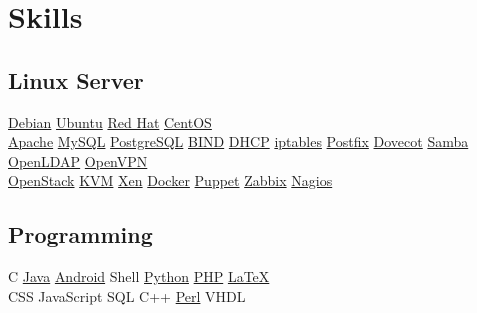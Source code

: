 \documentclass[]{deedy-resume-openfont}
\begin{document}
\begin{minipage}[t]{0.33\textwidth}

\section{Skills}
\subsection{Linux Server}
\href{http://www.debian.org/}{Debian} \textbullet{}
\href{http://www.ubuntu.com/}{Ubuntu} \textbullet{}
\href{http://www.redhat.com/}{Red Hat} \textbullet{}
\href{http://www.centos.org/}{CentOS} \\
\href{http://httpd.apache.org/}{Apache} \textbullet{}
\href{https://www.mysql.com/}{MySQL} \textbullet{}
\href{http://www.postgresql.org/}{PostgreSQL} \textbullet{}
\href{https://www.isc.org/downloads/bind/}{BIND}
\href{https://www.isc.org/downloads/dhcp/}{DHCP} \textbullet{}
\href{http://www.netfilter.org/}{iptables} \textbullet{}
\href{http://www.postfix.org/}{Postfix} \textbullet{}
\href{http://www.dovecot.org/}{Dovecot}
\href{https://www.samba.org/}{Samba} \textbullet{}
\href{http://www.openldap.org/}{OpenLDAP} \textbullet{}
\href{https://openvpn.net/}{OpenVPN} \\
\href{http://openstack.org/}{OpenStack} \textbullet{}
\href{http://www.linux-kvm.org/}{KVM} \textbullet{}
\href{http://xenproject.org/}{Xen} \textbullet{}
\href{http://www.docker.com/}{Docker}
\href{http://puppetlabs.com/}{Puppet} \textbullet{}
\href{http://www.zabbix.com/}{Zabbix} \textbullet{}
\href{http://www.nagios.com/}{Nagios}
\sectionsep

\subsection{Programming}
C \textbullet{}
\href{https://www.oracle.com/java/}{Java} \textbullet{}
\href{http://android.com}{Android} \textbullet{}
Shell \textbullet{}
\href{http://www.python.org}{Python}
\href{http://www.php.net}{PHP} \textbullet{}
\href{http://www.latex-project.org}{\LaTeX}\\
CSS \textbullet{}
JavaScript \textbullet{}
SQL \textbullet{}
C++ \textbullet{}
\href{https://www.perl.org/}{Perl}
VHDL
\sectionsep


\end{minipage}
\end{document}
